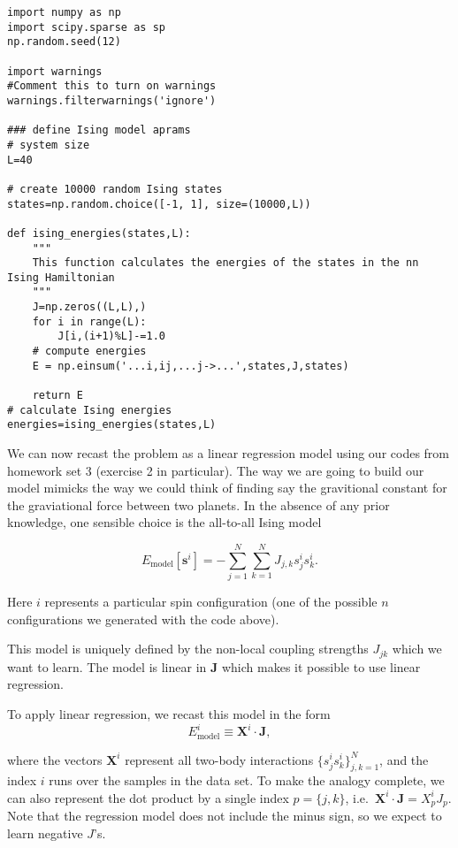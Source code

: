 \documentclass[%
oneside,                 %
final,                   %
10pt]{article}
\begin{document}
\begin{verbatim}
import numpy as np
import scipy.sparse as sp
np.random.seed(12)

import warnings
#Comment this to turn on warnings
warnings.filterwarnings('ignore')

### define Ising model aprams
# system size
L=40

# create 10000 random Ising states
states=np.random.choice([-1, 1], size=(10000,L))

def ising_energies(states,L):
    """
    This function calculates the energies of the states in the nn Ising Hamiltonian
    """
    J=np.zeros((L,L),)
    for i in range(L):
        J[i,(i+1)%L]-=1.0
    # compute energies
    E = np.einsum('...i,ij,...j->...',states,J,states)

    return E
# calculate Ising energies
energies=ising_energies(states,L)
\end{verbatim}

We can now recast the problem as a linear regression model using our codes from homework set 3 (exercise 2 in particular).
The way we are going to build our model mimicks the way we could think of finding say the gravitional constant for the graviational force between two planets.
In the absence of any prior knowledge, one sensible choice is the all-to-all Ising model

\[
E_\mathrm{model}[\boldsymbol{s}^i] = - \sum_{j=1}^N \sum_{k=1}^N J_{j,k}s_{j}^is_{k}^i.
\]

Here $i$ represents a particular spin configuration (one of the possible $n$ configurations we generated with the code above).

This model is uniquely defined by the non-local coupling strengths $J_{jk}$ which we want to learn.
The model is linear in $\mathbf{J}$ which makes it possible to use linear regression.

To apply linear regression, we recast this model in the form
\[
E_\mathrm{model}^i \equiv \mathbf{X}^i \cdot \mathbf{J},
\]

where the vectors $\mathbf{X}^i$ represent all two-body interactions
$\{s_{j}^is_{k}^i \}_{j,k=1}^N$, and the index $i$ runs over the
samples in the data set.  To make the analogy complete, we can also
represent the dot product by a single index $p = \{j,k\}$,
i.e.~$\mathbf{X}^i \cdot \mathbf{J}=X^i_pJ_p$.  Note that the
regression model does not include the minus sign, so we expect to
learn negative $J$'s.
\end{document}
